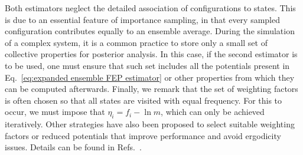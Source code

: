\documentclass[aip,jcp,reprint,amsmath,amssymb]{revtex4-1}
\begin{document}
Both estimators neglect the detailed association of configurations to states. This is due to an essential feature of importance sampling, in that every sampled configuration contributes equally to an ensemble average. During the simulation of a complex system, it is a common practice to store only a small set of collective properties for posterior analysis. In this case, if the second estimator is to be used, one must ensure that such set includes all the potentials present in Eq.~\eqref{eq:expanded ensemble FEP estimator} or other properties from which they can be computed afterwards. Finally, we remark that the set of weighting factors is often chosen so that all states are visited with equal frequency. For this to occur, we must impose that $\eta_i = f_i - \ln m$, which can only be achieved iteratively. Other strategies have also been proposed to select suitable weighting factors or reduced potentials that improve performance and avoid ergodicity issues. Details can be found in Refs.~.



\end{document}
